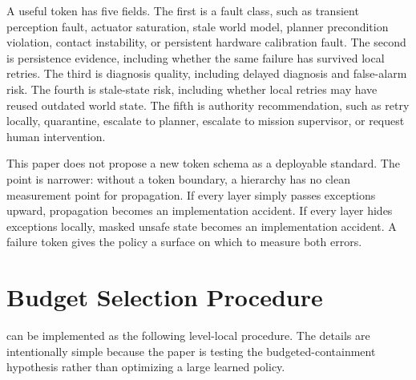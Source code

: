 A useful token has five fields. The first is a fault class, such as transient perception fault, actuator saturation, stale world model, planner precondition violation, contact instability, or persistent hardware calibration fault. The second is persistence evidence, including whether the same failure has survived local retries. The third is diagnosis quality, including delayed diagnosis and false-alarm risk. The fourth is stale-state risk, including whether local retries may have reused outdated world state. The fifth is authority recommendation, such as retry locally, quarantine, escalate to planner, escalate to mission supervisor, or request human intervention.

This paper does not propose a new token schema as a deployable standard. The point is narrower: without a token boundary, a hierarchy has no clean measurement point for propagation. If every layer simply passes exceptions upward, propagation becomes an implementation accident. If every layer hides exceptions locally, masked unsafe state becomes an implementation accident. A failure token gives the policy a surface on which to measure both errors.

\section{Budget Selection Procedure}

\method can be implemented as the following level-local procedure. The details are intentionally simple because the paper is testing the budgeted-containment hypothesis rather than optimizing a large learned policy.

